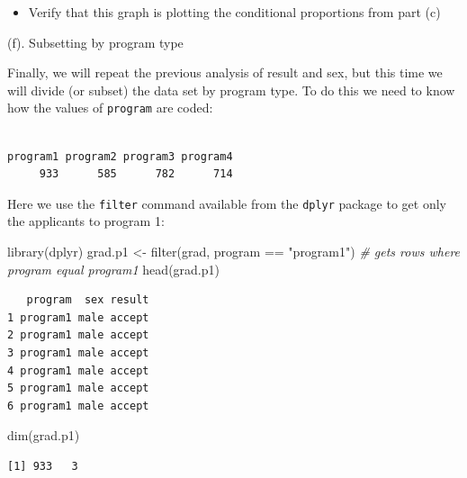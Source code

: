 \documentclass[
]{book}
\newenvironment{Shaded}{\begin{snugshade}}{\end{snugshade}}
\newcommand{\CommentTok}[1]{\textcolor[rgb]{0.56,0.35,0.01}{\textit{#1}}}
\newcommand{\FunctionTok}[1]{\textcolor[rgb]{0.00,0.00,0.00}{#1}}
\newcommand{\NormalTok}[1]{#1}
\newcommand{\OtherTok}[1]{\textcolor[rgb]{0.56,0.35,0.01}{#1}}
\newcommand{\SpecialCharTok}[1]{\textcolor[rgb]{0.00,0.00,0.00}{#1}}
\newcommand{\StringTok}[1]{\textcolor[rgb]{0.31,0.60,0.02}{#1}}
\providecommand{\tightlist}{%
  \setlength{\itemsep}{0pt}\setlength{\parskip}{0pt}}
\begin{document}
\begin{itemize}
\tightlist
\item
  Verify that this graph is plotting the conditional proportions from part (c)
\end{itemize}

(f). Subsetting by program type

Finally, we will repeat the previous analysis of result and sex, but this time we will divide (or subset) the data set by program type. To do this we need to know how the values of \texttt{program} are coded:

\begin{Shaded}
\end{Shaded}

\begin{verbatim}

program1 program2 program3 program4 
     933      585      782      714 
\end{verbatim}

Here we use the \texttt{filter} command available from the \texttt{dplyr} package to get only the applicants to program 1:

\begin{Shaded}
\begin{Highlighting}[]
\FunctionTok{library}\NormalTok{(dplyr)}
\NormalTok{grad.p1 }\OtherTok{\textless{}{-}} \FunctionTok{filter}\NormalTok{(grad, program }\SpecialCharTok{==} \StringTok{"program1"}\NormalTok{)  }\CommentTok{\# gets rows where program equal program1}
\FunctionTok{head}\NormalTok{(grad.p1)}
\end{Highlighting}
\end{Shaded}

\begin{verbatim}
   program  sex result
1 program1 male accept
2 program1 male accept
3 program1 male accept
4 program1 male accept
5 program1 male accept
6 program1 male accept
\end{verbatim}

\begin{Shaded}
\begin{Highlighting}[]
\FunctionTok{dim}\NormalTok{(grad.p1)}
\end{Highlighting}
\end{Shaded}

\begin{verbatim}
[1] 933   3
\end{verbatim}
\end{document}
